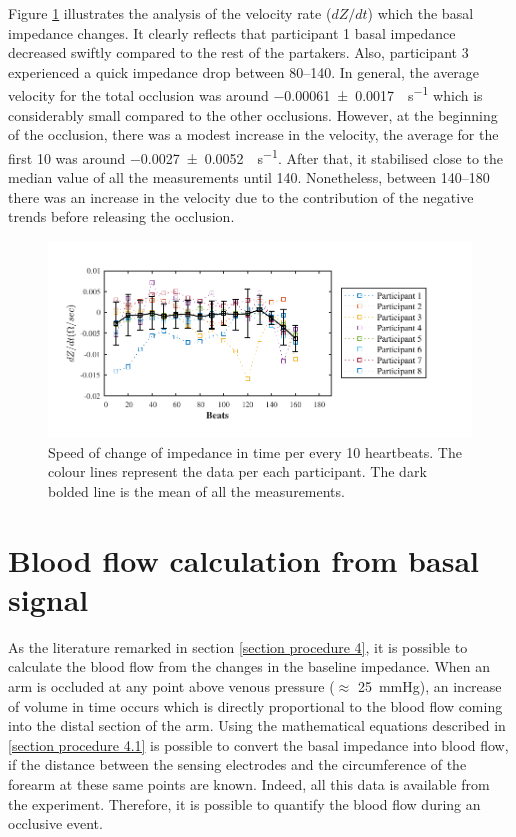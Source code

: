 Figure \ref{fig:total occlusion change} illustrates the analysis of the velocity rate ($dZ/dt$) which the basal impedance changes. It clearly reflects that participant 1 basal impedance decreased swiftly compared to the rest of the partakers. Also, participant 3 experienced a quick impedance drop between \SIrange{80}{140}{\beats}. In general, the average velocity for the total occlusion was around \SI{-0.00061(000170)}{\Omega\per\second} which is considerably small compared to the other occlusions. However, at the beginning of the occlusion, there was a modest increase in the velocity, the average for the first \SI{10}{\beats} was around \SI{-0.0027(00052)}{\Omega\per\second}. After that, it stabilised close to the median value of all the measurements until \SI{140}{\beats}. Nonetheless, between \SIrange{140}{180}{\beats} there was an increase in the velocity due to the contribution of the negative trends before releasing the occlusion. 

\begin{figure}[htbp]
	\centering
	\includegraphics[width=15cm,keepaspectratio]{figure_vop_9}    
	\caption[Rate of change of impedance per 10 heartbeats during total occlusion]{Speed of change of impedance in time per every 10 heartbeats. The colour lines represent the data per each participant. The dark bolded line is the mean of all the measurements.}
	\label{fig:total occlusion change}
\end{figure} 




\section{Blood flow calculation from basal signal}
\label{section occlusion 2}
As the literature remarked in section \ref{section procedure 4}, it is possible to calculate the blood flow from the changes in the baseline impedance. When an arm is occluded at any point above venous pressure ($\approx$ \SI{25}{\mmHg}), an increase of volume in time occurs which is directly proportional to the blood flow coming into the distal section of the arm. Using the mathematical equations described in \ref{section procedure 4.1} is possible to convert the basal impedance into blood flow, if the distance between the sensing electrodes and the circumference of the forearm at these same points are known. Indeed, all this data is available from the experiment. Therefore, it is possible to quantify the blood flow during an occlusive event.  

